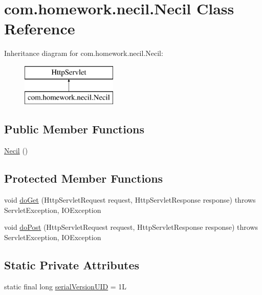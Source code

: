 \hypertarget{classcom_1_1homework_1_1necil_1_1_necil}{}\section{com.\+homework.\+necil.\+Necil Class Reference}
\label{classcom_1_1homework_1_1necil_1_1_necil}
Inheritance diagram for com.\+homework.\+necil.\+Necil\+:\begin{figure}[H]
\begin{center}
\leavevmode
\includegraphics[height=2.000000cm]{classcom_1_1homework_1_1necil_1_1_necil}
\end{center}
\end{figure}
\subsection*{Public Member Functions}
\begin{DoxyCompactItemize}
\item 
\hyperlink{classcom_1_1homework_1_1necil_1_1_necil_a1b53c7e47f81edf92d25150a2ecfba5b}{Necil} ()
\end{DoxyCompactItemize}
\subsection*{Protected Member Functions}
\begin{DoxyCompactItemize}
\item 
void \hyperlink{classcom_1_1homework_1_1necil_1_1_necil_a91bd9db24f4e7cb4129e352f66cbdbbf}{do\+Get} (Http\+Servlet\+Request request, Http\+Servlet\+Response response)  throws Servlet\+Exception, I\+O\+Exception 
\item 
void \hyperlink{classcom_1_1homework_1_1necil_1_1_necil_a45030251ca10a28047d5aa5f4c381983}{do\+Post} (Http\+Servlet\+Request request, Http\+Servlet\+Response response)  throws Servlet\+Exception, I\+O\+Exception 
\end{DoxyCompactItemize}
\subsection*{Static Private Attributes}
\begin{DoxyCompactItemize}
\item 
static final long \hyperlink{classcom_1_1homework_1_1necil_1_1_necil_a6b86c82842a7ebb56f07f3367e084e76}{serial\+Version\+U\+ID} = 1L
\end{DoxyCompactItemize}



